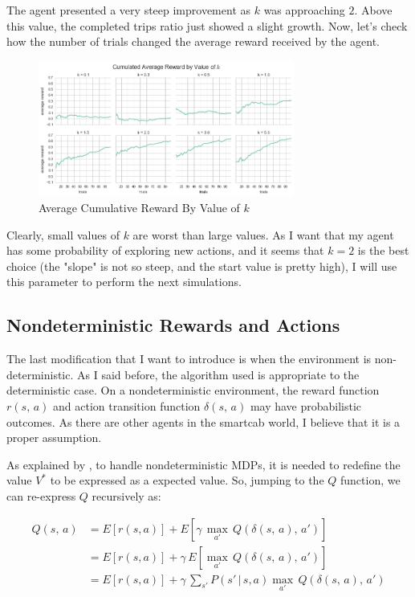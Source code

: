\documentclass[a4paper]{article}
\begin{document}
The agent presented a very steep improvement as $k$ was approaching $2$. Above this value, the completed trips ratio just showed a slight growth. Now, let's check how the number of trials changed the average reward received by the agent.

\begin{figure}[ht!]
\centering
\includegraphics[width=0.75\textwidth]{images/cum_reward_by_k.png}
\caption{\label{fig:cum_reward_by_k}Average Cumulative Reward By Value of $k$}
\end{figure}

Clearly, small values of $k$ are worst than large values. As I want that my agent has some probability of exploring new actions, and it seems that $k=2$ is the best choice (the "slope" is not so steep, and the start value is pretty high), I will use this parameter to perform the next simulations.

\subsection{Nondeterministic Rewards and Actions}
The last modification that I want to introduce is when the environment is non-deterministic. As I said before, the algorithm used is appropriate to the deterministic case. On a nondeterministic environment, the reward function $r(s,\,a)$ and action transition function $\delta(s,\,a)$ may have probabilistic outcomes. As there are other agents in the smartcab world, I believe that it is a proper assumption.

As explained by \cite{Mitchell}, to handle nondeterministic MDPs, it is needed to redefine the value $V^{*}$ to be expressed as a expected value. So, jumping to the $Q$ function, we can re-express $Q$ recursively as:

\begin{equation}
\begin{aligned}
Q(s, \, a) &= E \left [r(s, a) \right ] + E \left [\gamma \, \underset{a'}{\max} \, Q(\delta(s,\, a), \, a')\right ]\\
&= E \left [r(s, a) \right ] + \gamma \,  E \left [\underset{a'}{\max} \, Q(\delta(s,\, a), \, a')\right ]\\
&= E \left [r(s, a) \right ] + \gamma \,  \sum_{s'} P\left(s' \,| \,s, a   \right) \underset{a'}{\max} \, Q(\delta(s,\, a), \, a')
\end{aligned}
\end{equation}
\end{document}
